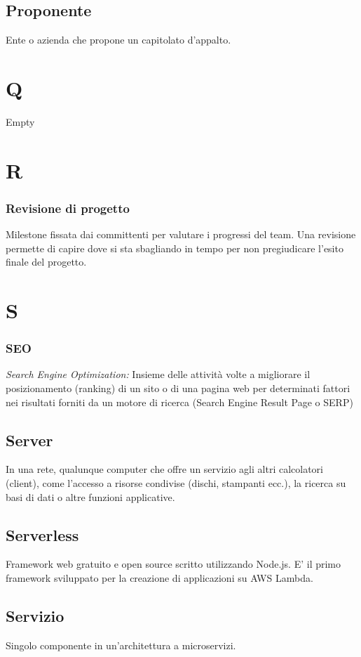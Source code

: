 \subsection*{Proponente}
Ente o azienda che propone un capitolato d'appalto.

\section*{Q}
Empty

\section*{R}
\subsubsection*{Revisione di progetto}
Milestone fissata dai committenti per valutare i progressi del team. Una revisione permette di capire dove si sta sbagliando in tempo per non pregiudicare l'esito finale del progetto.

\section*{S}
\subsubsection*{SEO}
\textit{Search Engine Optimization:} Insieme delle attività volte a migliorare il posizionamento (ranking) di un sito o di una pagina web per determinati fattori nei risultati forniti
da un motore di ricerca (Search Engine Result Page o SERP)

\subsection*{Server}
In una rete, qualunque computer che offre un servizio agli altri calcolatori (client), come l'accesso a risorse condivise (dischi, stampanti ecc.), la ricerca su basi di dati o altre funzioni applicative.

\subsection*{Serverless}
Framework web gratuito e open source scritto utilizzando Node.js. E' il primo framework sviluppato per la creazione di applicazioni su AWS Lambda.

\subsection*{Servizio}
Singolo componente in un'architettura a microservizi.

